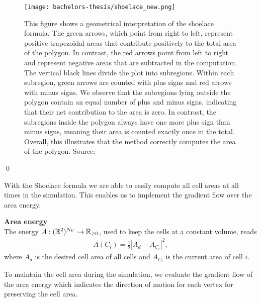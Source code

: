 \begin{proposition}
	\begin{figure}
		\begin{center}
			\texttt{[image: bachelors-thesis/shoelace\_new.png]}
			\caption{
				This figure shows a geometrical interpretation of the shoelace formula.
				The green arrows, which point from right to left, represent positive trapezoidal areas that contribute positively to the total area of the polygon.
				In contrast, the red arrows point from left to right and represent negative areas that are subtracted in the computation.
				The vertical black lines divide the plot into subregions.
				Within each subregion, green arrows are counted with plus signs and red arrows with minus signs.
				We observe that the subregions lying outside the polygon contain an equal number of plus and minus signs, indicating that their net contribution to the area is zero.
				In contrast, the subregions inside the polygon always have one more plus sign than minus signs, meaning their area is counted exactly once in the total.
				Overall, this illustrates that the method correctly computes the area of the polygon.
				Source:~\cite{ShoelaceFigure2022}}
			\label{fig:shoelace}
		\end{center}
	\end{figure}
	\qed
\end{proposition}

With the Shoelace formula we are able to easily compute all cell areas at all times in the simulation. 
This enables us to implement the gradient flow over the area energy. 

\begin{definition} \textbf{Area energy} \\
	The energy $A: (\mathbb{R}^2)^{N_V} \rightarrow \mathbb{R}_{\geq 0}$, used to keep the cells at a constant volume, reads 
	\begin{align}
		A(C_i) = \frac{1}{2} | A_d - A_{C_i}|^2, \label{eq:areaEnergy} 
	\end{align}
	where $A_d$ is the desired cell area of all cells and $A_{C_i}$ is the current area of cell $i$. 
\end{definition}

To maintain the cell area during the simulation, we evaluate the gradient flow of the area energy which indicates the direction of motion for each vertex for preserving the cell area.

